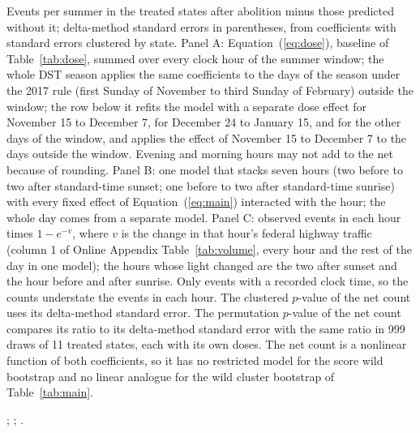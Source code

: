 \begin{table}[tbp]
  \caption{Excess Events per Summer after Abolition}
  \label{tab:excess}
  \centering\footnotesize
  
  \begin{tablenotes}[Notes]
  Events per summer in the treated states after abolition minus those predicted without it; delta-method standard errors in parentheses, from coefficients with standard errors clustered by state. Panel A: Equation~(\ref{eq:dose}), baseline of Table~\ref{tab:dose}, summed over every clock hour of the summer window; the whole DST season applies the same coefficients to the days of the season under the 2017 rule (first Sunday of November to third Sunday of February) outside the window; the row below it refits the model with a separate dose effect for November 15 to December 7, for December 24 to January 15, and for the other days of the window, and applies the effect of November 15 to December 7 to the days outside the window. Evening and morning hours may not add to the net because of rounding. Panel B: one model that stacks seven hours (two before to two after standard-time sunset; one before to two after standard-time sunrise) with every fixed effect of Equation~(\ref{eq:main}) interacted with the hour; the whole day comes from a separate model. Panel C: observed events in each hour times $1 - e^{-v}$, where $v$ is the change in that hour's federal highway traffic (column 1 of Online Appendix Table~\ref{tab:volume}, every hour and the rest of the day in one model); the hours whose light changed are the two after sunset and the hour before and after sunrise. Only events with a recorded clock time, so the counts understate the events in each hour. The clustered $p$-value of the net count uses its delta-method standard error. The permutation $p$-value of the net count compares its ratio to its delta-method standard error with the same ratio in 999 draws of 11 treated states, each with its own doses. The net count is a nonlinear function of both coefficients, so it has no restricted model for the score wild bootstrap and no linear analogue for the wild cluster bootstrap of Table~\ref{tab:main}.
  \end{tablenotes}
  \begin{tablenotes}[Sources]
  \citet{datasus2025sim}; \citet{prf2025dados}; \citet{dnit2025pnct}.
  \end{tablenotes}
\end{table}

